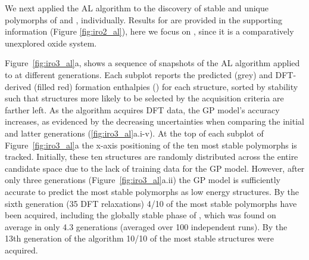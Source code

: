 %



%
We next applied the AL algorithm to the discovery of stable and unique polymorphs of \IrOtwo and \IrOthree, individually.
%
Results for \IrOtwo are provided in the supporting information (Figure \ref{fig:iro2_al}), here we focus on \IrOthree,
since it is a comparatively unexplored oxide system.


%
%
Figure~\ref{fig:iro3_al}a, shows a sequence of snapshots of the AL algorithm applied to \IrOthree at different generations.
%
Each subplot reports the predicted (grey) and DFT-derived (filled red) formation enthalpies (\DHf) for each structure, sorted by stability such that structures more likely to be selected by the acquisition criteria are farther left.
%
As the algorithm acquires DFT data, the GP model's accuracy increases,
as evidenced by the decreasing uncertainties when comparing the initial and latter generations (\ref{fig:iro3_al}a.i-v).
%
At the top of each subplot of Figure~\ref{fig:iro3_al}a the x-axis positioning of the ten most stable polymorphs is tracked.
%
Initially, these ten structures are randomly distributed across the entire candidate space due to the lack of training data for the GP model.
%
However, after only three generations (Figure~\ref{fig:iro3_al}a.ii) the GP model is sufficiently accurate to predict the most stable polymorphs as low energy structures.
%
By the sixth generation (\num{35} DFT relaxations) \num{4/10} of the most stable polymorphs have been acquired,
including the globally stable phase of \IrOthree, which
was found on average in only 4.3 generations (averaged over 100 independent runs).
%
By the 13th generation of the algorithm \num{10/10} of the most stable structures were acquired.



